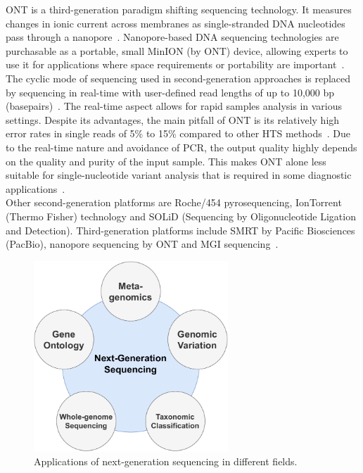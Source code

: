 \ac{ONT} is a third-generation paradigm shifting sequencing technology. It measures changes in ionic current across membranes as single-stranded \ac{DNA} nucleotides pass through a nanopore~\cite{jain2016oxford}. Nanopore-based \ac{DNA} sequencing technologies are purchasable as a portable, small MinION (by \ac{ONT}) device, allowing experts to use it for applications where space requirements or portability are important~\cite{jain2016oxford, greninger2015rapid}. The cyclic mode of sequencing used in second-generation approaches is replaced by sequencing in real-time with user-defined read lengths of up to 10,000 bp (basepairs)~\cite{jain2016oxford}. The real-time aspect allows for rapid samples analysis in various settings. Despite its advantages, the main pitfall of \ac{ONT} is its relatively high error rates in single reads of 5\% to 15\% compared to other \ac{HTS} methods~\cite{fu2019comparative, laver2015assessing}. Due to the real-time nature and avoidance of \ac{PCR}, the output quality highly depends on the quality and purity of the input sample. This makes \ac{ONT} alone less suitable for single-nucleotide variant analysis that is required in some diagnostic applications~\cite{bowden2019sequencing, stefan2022comparison}. \\
Other second-generation platforms are Roche/454 pyrosequencing, IonTorrent (Thermo Fisher) technology and SOLiD (Sequencing by Oligonucleotide Ligation and Detection). Third-generation platforms include \ac{SMRT} by Pacific Biosciences (PacBio), nanopore sequencing by \ac{ONT} and MGI sequencing~\cite{rhoads2015pacbio}. 

\begin{figure}[ht!]
	\centering
	\includegraphics[width=0.65\textwidth]{media/2-ngs.pdf}
	\caption{Applications of next-generation sequencing in different fields.}
	\label{fig:2-ngs}
\end{figure} 


